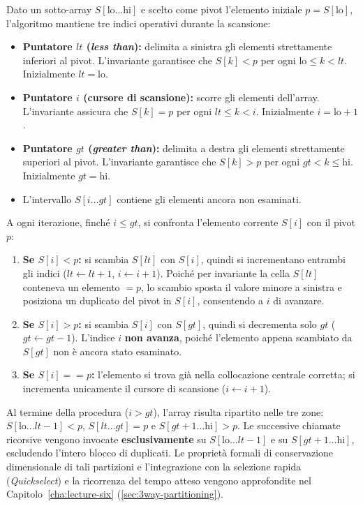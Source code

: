 Dato un sotto-array $S[\text{lo} \dots \text{hi}]$ e scelto come pivot l'elemento iniziale $p = S[\text{lo}]$, l'algoritmo mantiene tre indici operativi durante la scansione:
\begin{itemize}
  \item \textbf{Puntatore $lt$ (\textit{less than}):} delimita a sinistra gli elementi strettamente inferiori al pivot. L'invariante garantisce che $S[k] < p$ per ogni $\text{lo} \le k < lt$. Inizialmente $lt = \text{lo}$.
  \item \textbf{Puntatore $i$ (cursore di scansione):} scorre gli elementi dell'array. L'invariante assicura che $S[k] = p$ per ogni $lt \le k < i$. Inizialmente $i = \text{lo} + 1$.
  \item \textbf{Puntatore $gt$ (\textit{greater than}):} delimita a destra gli elementi strettamente superiori al pivot. L'invariante garantisce che $S[k] > p$ per ogni $gt < k \le \text{hi}$. Inizialmente $gt = \text{hi}$.
  \item L'intervallo $S[i \dots gt]$ contiene gli elementi ancora non esaminati.
\end{itemize}

A ogni iterazione, finché $i \le gt$, si confronta l'elemento corrente $S[i]$ con il pivot $p$:
\begin{enumerate}
  \item \textbf{Se $S[i] < p$:} si scambia $S[lt]$ con $S[i]$, quindi si incrementano entrambi gli indici ($lt \leftarrow lt + 1$, $i \leftarrow i + 1$). Poiché per invariante la cella $S[lt]$ conteneva un elemento $= p$, lo scambio sposta il valore minore a sinistra e posiziona un duplicato del pivot in $S[i]$, consentendo a $i$ di avanzare.
  \item \textbf{Se $S[i] > p$:} si scambia $S[i]$ con $S[gt]$, quindi si decrementa solo $gt$ ($gt \leftarrow gt - 1$). L'indice $i$ \textbf{non avanza}, poiché l'elemento appena scambiato da $S[gt]$ non è ancora stato esaminato.
  \item \textbf{Se $S[i] == p$:} l'elemento si trova già nella collocazione centrale corretta; si incrementa unicamente il cursore di scansione ($i \leftarrow i + 1$).
\end{enumerate}

Al termine della procedura ($i > gt$), l'array risulta ripartito nelle tre zone: $S[\text{lo} \dots lt-1] < p$, $S[lt \dots gt] = p$ e $S[gt+1 \dots \text{hi}] > p$. Le successive chiamate ricorsive vengono invocate \textbf{esclusivamente} su $S[\text{lo} \dots lt-1]$ e su $S[gt+1 \dots \text{hi}]$, escludendo l'intero blocco di duplicati. Le proprietà formali di conservazione dimensionale di tali partizioni e l'integrazione con la selezione rapida (\textit{Quickselect}) e la ricorrenza del tempo atteso vengono approfondite nel Capitolo~\ref{cha:lecture-six} (\autoref{sec:3way-partitioning}).

